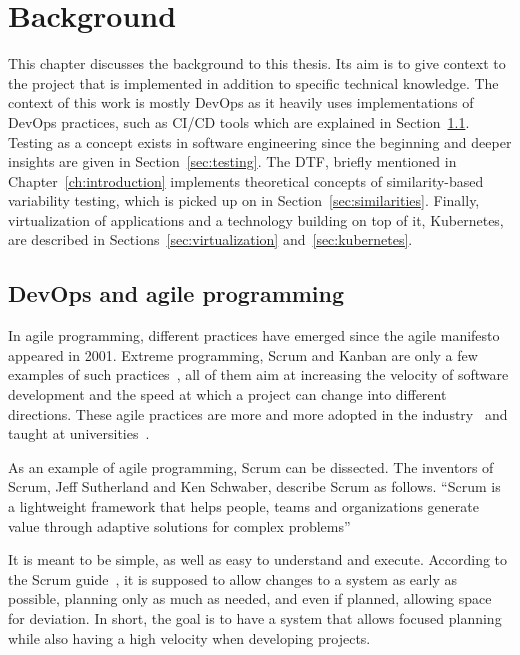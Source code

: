\chapter{Background}\label{ch:background}

This chapter discusses the background to this thesis.
Its aim is to give context to the project that is implemented in addition to specific technical knowledge.
The context of this work is mostly DevOps as it heavily uses implementations of DevOps practices, such as CI/CD tools which are explained in Section~\ref{sec:devops-and-agile-programming}.
Testing as a concept exists in software engineering since the beginning and deeper insights are given in Section~\ref{sec:testing}.
The DTF, briefly mentioned in Chapter~\ref{ch:introduction} implements theoretical concepts of similarity-based variability testing, which is picked up on in Section~\ref{sec:similarities}.
Finally, virtualization of applications and a technology building on top of it, Kubernetes, are described in Sections~\ref{sec:virtualization} and~\ref{sec:kubernetes}.

\section{DevOps and agile programming}\label{sec:devops-and-agile-programming}

In agile programming, different practices have emerged since the agile manifesto~\cite{AgileManifesto} appeared in 2001.
Extreme programming, Scrum and Kanban are only a few examples of such practices~\cite{ADecadeOfAgileMethodologies}, all of them aim at increasing the velocity of software development and the speed at which a project can change into different directions.
These agile practices are more and more adopted in the industry~\cite{BecomingAgileTogether} and taught at universities~\cite{StudienhandbuchProjectManagement}.

As an example of agile programming, Scrum can be dissected.
The inventors of Scrum, Jeff Sutherland and Ken Schwaber, describe Scrum as follows.
``Scrum is a lightweight framework that helps people, teams and organizations generate value through adaptive solutions for complex problems''~\cite{the-scrum-guide}

\pagebreak

It is meant to be simple, as well as easy to understand and execute.
According to the Scrum guide~\cite{the-scrum-guide}, it is supposed to allow changes to a system as early as possible, planning only as much as needed, and even if planned, allowing space for deviation.
In short, the goal is to have a system that allows focused planning while also having a high velocity when developing projects.

